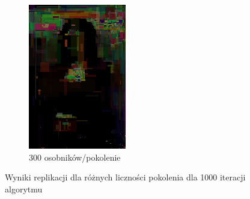 \begin{figure}[!htb]
\begin{subfigure}[b]{0.3\textwidth}
         \includegraphics[width=\textwidth]{images/mona/10000_300_2/img_0_it_1000_best.png}
         \caption{300 osobników/pokolenie}
    \end{subfigure}
    \caption{Wyniki replikacji dla różnych liczności pokolenia dla 1000 iteracji algorytmu}
    \label{fig:generations_1}
\end{figure}


